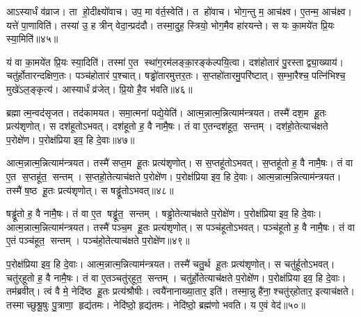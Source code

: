 आऽस्यार्धं व॑व्राज।
ता हो॒दीक्ष्यो॑वाच।
उप॒ मा व॑र्त॒स्वेति॑।
त हो॑वाच।
भोग॒न्तु म॒ आच॑क्ष्व।
ए॒तन्म॒ आच॑क्ष्व।
यत्ते॑ पा॒णाविति॑।
तस्या॑ उ॒ ह त्रीन् वेदा॒न्प्रद॑दौ।
तस्मा॒दुह॒ स्त्रियो॒ भोग॒मैव हा॑रयन्ते।
स यः का॒मये॑त प्रि॒यः स्या॒मिति॑॥४५॥

यं वा का॒मये॑त प्रि॒यः स्या॒दिति॑।
तस्मा॑ ए॒त स्था॑ग॒रम॑लङ्का॒रङ्क॑ल्पयि॒त्वा।
दश॑होतारं पु॒रस्ताद्व्या॒ख्याय॑।
चतु॑र्\mbox{}होतारन्दक्षिण॒तः।
पञ्च॑होतारं प॒श्चात्।
षड्ढो॑तारमुत्तर॒तः।
स॒प्तहो॑तारमु॒परि॑ष्टात्।
स॒म्भा॒रैश्च॒ पत्नि॑भिश्च॒ मुखे॑ऽल॒ङ्कृत्य॑।
आस्यार्धं व्र॑जेत्।
प्रि॒यो है॒व भ॑वति॥४६॥\anuvakamend[अ॒या॒न्य॒ल॒ङ्कृत्य॑ स्या॒मिति॑ भवति]

ब्रह्मात्म॒न्वद॑सृजत।
तद॑कामयत।
समा॒त्मना॑ पद्ये॒येति॑।
आत्म॒न्नात्म॒न्नित्याम॑न्त्रयत।
तस्मै॑ दश॒म हू॒तः प्रत्य॑शृणोत्।
स दश॑हूतोऽभवत्।
दश॑हूतो ह॒ वै नामै॒षः।
तं वा ए॒तन्दश॑हूत॒ सन्तम्।
दश॑हो॒तेत्याच॑क्षते प॒रोक्षे॑ण।
प॒रोक्ष॑प्रिया इव॒ हि दे॒वाः॥४७॥

आत्म॒न्नात्म॒न्नित्याम॑न्त्रयत।
तस्मै॑ सप्त॒म हू॒तः प्रत्य॑शृणोत्।
स स॒प्तहू॑तोऽभवत्।
स॒प्तहू॑तो ह॒ वै नामै॒षः।
तं वा ए॒त स॒प्तहू॑त॒ सन्तम्।
स॒प्तहो॒तेत्याच॑क्षते प॒रोक्षे॑ण।
प॒रोक्ष॑प्रिया इव॒ हि दे॒वाः।
आत्म॒न्नात्म॒न्नित्याम॑न्त्रयत।
तस्मै॑ ष॒ष्ठ हू॒तः प्रत्य॑शृणोत्।
स षड्ढू॑तोऽभवत्॥४८॥

षड्ढू॑तो ह॒ वै नामै॒षः।
तं वा ए॒त षड्ढू॑त॒ सन्तम्।
षड्ढो॒तेत्याच॑क्षते प॒रोक्षे॑ण।
प॒रोक्ष॑प्रिया इव॒ हि दे॒वाः।
आत्म॒न्नात्म॒न्नित्याम॑न्त्रयत।
तस्मै॑ पञ्च॒म हू॒तः प्रत्य॑शृणोत्।
स पञ्च॑हूतोऽभवत्।
पञ्च॑हूतो ह॒ वै नामै॒षः।
तं वा ए॒तं पञ्च॑हूत॒ सन्तम्।
पञ्च॑हो॒तेत्याच॑क्षते प॒रोक्षे॑ण॥४९॥

प॒रोक्ष॑प्रिया इव॒ हि दे॒वाः।
आत्म॒न्नात्म॒न्नित्याम॑न्त्रयत।
तस्मै॑ चतु॒र्थ हू॒तः प्रत्य॑शृणोत्।
स चतु॑र्\mbox{}हूतोऽभवत्।
चतु॑र्‌हूतो ह॒ वै नामै॒षः।
तं वा ए॒तञ्चतु॑र्‌हूत॒ सन्तम्।
चतु॑र्हो॒तेत्याच॑क्षते प॒रोक्षे॑ण।
प॒रोक्ष॑प्रिया इव॒ हि दे॒वाः।
तम॑ब्रवीत्।
त्वं वै मे॒ नेदि॑ष्ठ हू॒तः प्रत्य॑श्रौषीः।
त्वयै॑नानाख्या॒तार॒ इति॑।
तस्मा॒न्नु है॑ना॒श्चतु॑र्‌होतार॒ इत्याच॑क्षते।
तस्माच्छुश्रू॒षुः पु॒त्राणा॒ हृद्य॑तमः।
नेदि॑ष्ठो॒ हृद्य॑तमः।
नेदि॑ष्ठो॒ ब्रह्म॑णो भवति।
य ए॒वं वेद॑॥५०॥\anuvakamend[दे॒वाष्षड्ढू॑तोऽभव॒त्पञ्च॑हो॒तेत्याच॑क्षते प॒रोक्षे॑णाश्रौषी॒ष्षट्च॑]




\clearpage
{}
\setcounter{anuvakam}{0}

